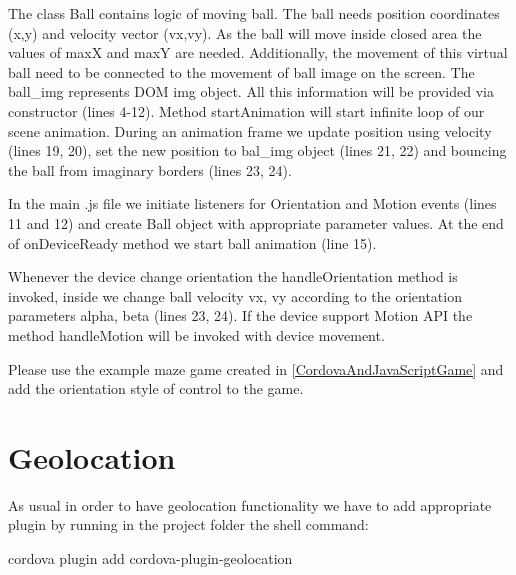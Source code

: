 
\begin{explain}
The class Ball contains logic of moving ball. The ball needs position coordinates (x,y) and velocity vector (vx,vy). As the ball will move inside closed area the values of maxX and maxY are needed. Additionally, the movement of this virtual ball need to be connected to the movement of ball image on the screen. The ball\_img represents DOM img object. All this information will be provided via constructor (lines 4-12). Method startAnimation will start infinite loop of our scene animation. During an animation frame we update position using velocity (lines 19, 20), set the new position to bal\_img object (lines 21, 22) and bouncing the ball from imaginary borders (lines 23, 24).
\end{explain}


\begin{explain}
 In the main .js file we initiate listeners for Orientation and Motion events (lines 11 and 12) and create Ball object with appropriate parameter values. At the end of onDeviceReady method we start ball animation (line 15).

Whenever the device change orientation the handleOrientation method is invoked, inside we change ball velocity vx, vy according to the orientation parameters alpha, beta (lines 23, 24). If the device support Motion API the method handleMotion will be invoked with device movement.
\end{explain}

\begin{extercises}
Please use the example maze game created in \ref{CordovaAndJavaScriptGame} and add the orientation style of control to the game.
\end{extercises}

\section{Geolocation}

As usual in order to have geolocation functionality we have to add appropriate plugin by running in the project folder the shell command:

\begin{shell}
cordova plugin add cordova-plugin-geolocation
\end{shell}

